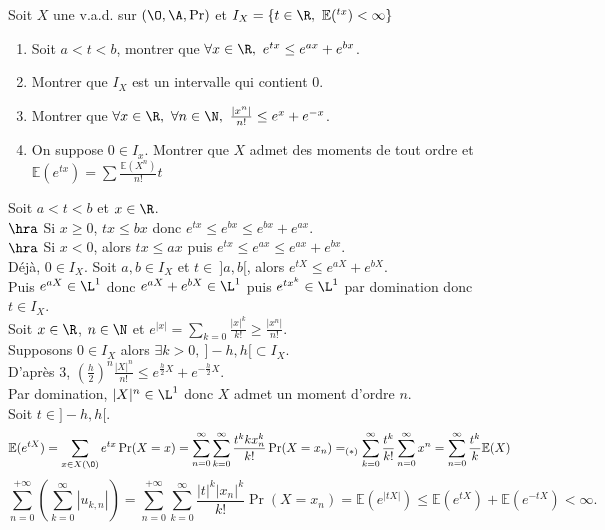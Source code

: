 \documentclass[11pt]{article}
\renewcommand*{\E}{\mathbb{E}}
\begin{document}
\pagebreak

\begin{exercice}{}{}
    Soit $X$ une v.a.d. sur $(\O,\A,\Pr)$ et $I_X=\{t\in\R, ~ \E(^{tx}) < \infty\}$
    \begin{enumerate}
        \item Soit $a<t<b$, montrer que $\forall x \in \R, ~ e^{tx} \leq e^{ax} + e^{bx}$.
        \item Montrer que $I_X$ est un intervalle qui contient 0.
        \item Montrer que $\forall x \in \R, ~ \forall n \in \N, ~ \frac{|x^n|}{n!}\leq e^x + e^{-x}$.
        \item On suppose $0\in I_x$. Montrer que $X$ admet des moments de tout ordre et $\E(e^{tx})=\sum \frac{\E(X^n)}{n!}t$
    \end{enumerate}
    \tcblower
     Soit $a<t<b$ et $x\in\R$.\\
    $\hra$ Si $x\geq0$, $tx\leq bx$ donc $e^{tx}\leq e^{bx} \le e^{bx}+e^{ax}$.\\
    $\hra$ Si $x<0$, alors $tx\leq ax$ puis $e^{tx} \leq e^{ax} \leq e^{ax} + e^{bx}$.\\
     Déjà, $0\in I_X$. Soit $a,b\in I_X$ et $t\in~]a,b[$, alors $e^{tX} \leq e^{aX} + e^{bX}$.\\
    Puis $e^{aX} \in \L^1$ donc $e^{aX} + e^{bX} \in \L^1$ puis $e^{tx^k} \in \L^1$ par domination donc $t\in I_X$.\\
     Soit $x\in\R$, $n\in\N$ et $e^{|x|}=\sum_{k=0}\frac{|x|^k}{k!}\geq \frac{|x^n|}{n!}$.\\
     Supposons $0\in I_X$ alors $\exists k>0, ~ ]-h,h[\subset I_X$.\\
    D'après $3$, $\left( \frac{h}{2} \right)^n\frac{|X|^n}{n!}\leq e^{\frac{h}{2}X} + e^{-\frac{h}{2}X}$.\\
    Par domination, $|X|^n\in\L^1$ donc $X$ admet un moment d'ordre $n$.\\
    Soit $t\in]-h,h[$.
    \begin{equation*}
        \E(e^{tX}) = \sum_{x\in X(\O)} e^{tx}\Pr(X=x) = \sum_{n=0}^{\infty}\sum_{k=0}^{\infty}\frac{t^kkx_n^k}{k!}\Pr(X=x_n) =_{(*)} \sum_{k=0}^{\infty}\frac{t^k}{k!}\sum_{n=0}^\infty x^n = \sum_{n=0}^{\infty}\frac{t^k}{k}\E(X)
    \end{equation*}
    \begin{equation*}
        \sum_{n=0}^{+\infty}\left( \sum_{k=0}^{\infty} |u_{k,n}| \right) = \sum_{n=0}^{+\infty}\sum_{k=0}^{\infty}\frac{|t|^k|x_n|^k}{k!}\Pr(X=x_n)=\E(e^{|tX|}) \leq \E(e^{tX}) + \E(e^{-tX})< \infty. \tag{*}
    \end{equation*}
\end{exercice}
\end{document}
